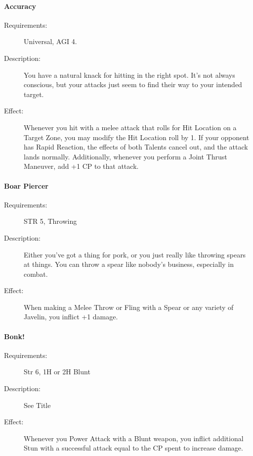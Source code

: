 \documentclass[oneside,11pt,english]{book}
\begin{document}
\paragraph{\label{talent:Accuracy}Accuracy}
	\begin{description}
		\item [Requirements:] Universal, AGI 4. 
		\item [Description:] You have a natural knack for hitting in the right spot. It's not always conscious, but your 
attacks just seem to find their way to your intended target. 
		\item [Effect:] Whenever you hit with a melee attack that rolls for Hit Location on a Target Zone, you may modify the Hit Location roll by 1. If your opponent has Rapid Reaction, the effects of both Talents cancel 
out, and the attack lands normally. 
Additionally, whenever you perform a Joint Thrust Maneuver, add +1 CP to that attack. 
	\end{description}
\paragraph{\label{talent:Boar Piercer}Boar Piercer}
	\begin{description}
		\item [Requirements:] STR 5, Throwing 
		\item [Description:] Either you’ve got a thing for pork, or you just really like throwing spears at things. You can 
throw a spear like nobody’s business, especially in combat. 
		\item [Effect:] When making a Melee Throw or Fling with a Spear or any variety of Javelin, you inflict +1 
damage. 
	\end{description}
\paragraph{\label{talent:Bonk!}Bonk!}
	\begin{description}
		\item [Requirements:] Str 6, 1H or 2H Blunt 
		\item [Description:] See Title 
		\item [Effect:] Whenever you Power Attack with a Blunt weapon, you inflict additional Stun with a successful attack equal to the CP spent to increase damage. 
	\end{description}
\end{document}
